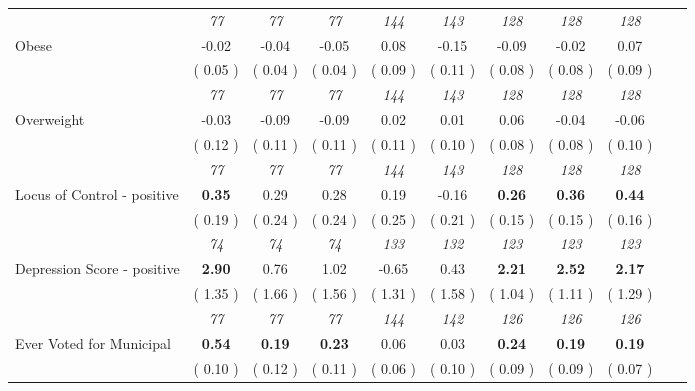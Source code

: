 \begin{tabular}{l c c c c c c c c c c}
& \textit{ 77 } & \textit{ 77 } & \textit{ 77 } & \textit{ 144 } & \textit{ 143 } & \textit{ 128 } & \textit{ 128 } & \textit{ 128 } \\
Obese &     -0.02 &     -0.04 &     -0.05 &      0.08 &     -0.15 &     -0.09 &     -0.02 &      0.07 \\
& (     0.05 ) & (     0.04 ) & (     0.04 ) & (     0.09 ) & (     0.11 ) & (     0.08 ) & (     0.08 ) & (     0.09 ) \\
& \textit{ 77 } & \textit{ 77 } & \textit{ 77 } & \textit{ 144 } & \textit{ 143 } & \textit{ 128 } & \textit{ 128 } & \textit{ 128 } \\
Overweight &     -0.03 &     -0.09 &     -0.09 &      0.02 &      0.01 &      0.06 &     -0.04 &     -0.06 \\
& (     0.12 ) & (     0.11 ) & (     0.11 ) & (     0.11 ) & (     0.10 ) & (     0.08 ) & (     0.08 ) & (     0.10 ) \\
& \textit{ 77 } & \textit{ 77 } & \textit{ 77 } & \textit{ 144 } & \textit{ 143 } & \textit{ 128 } & \textit{ 128 } & \textit{ 128 } \\
Locus of Control - positive & \textbf{      0.35 } &      0.29 &      0.28 &      0.19 &     -0.16 & \textbf{      0.26 } & \textbf{      0.36 } & \textbf{      0.44 } \\
& (     0.19 ) & (     0.24 ) & (     0.24 ) & (     0.25 ) & (     0.21 ) & (     0.15 ) & (     0.15 ) & (     0.16 ) \\
& \textit{ 74 } & \textit{ 74 } & \textit{ 74 } & \textit{ 133 } & \textit{ 132 } & \textit{ 123 } & \textit{ 123 } & \textit{ 123 } \\
Depression Score - positive & \textbf{      2.90 } &      0.76 &      1.02 &     -0.65 &      0.43 & \textbf{      2.21 } & \textbf{      2.52 } & \textbf{      2.17 } \\
& (     1.35 ) & (     1.66 ) & (     1.56 ) & (     1.31 ) & (     1.58 ) & (     1.04 ) & (     1.11 ) & (     1.29 ) \\
& \textit{ 77 } & \textit{ 77 } & \textit{ 77 } & \textit{ 144 } & \textit{ 142 } & \textit{ 126 } & \textit{ 126 } & \textit{ 126 } \\
Ever Voted for Municipal & \textbf{      0.54 } & \textbf{      0.19 } & \textbf{      0.23 } &      0.06 &      0.03 & \textbf{      0.24 } & \textbf{      0.19 } & \textbf{      0.19 } \\
& (     0.10 ) & (     0.12 ) & (     0.11 ) & (     0.06 ) & (     0.10 ) & (     0.09 ) & (     0.09 ) & (     0.07 ) \\

\end{tabular}
